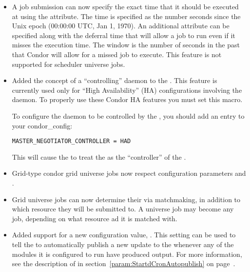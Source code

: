 \begin{itemize}
\item A job submission can now specify the exact time that it should be
executed at using the  attribute. The time is specified
as the number seconds since the Unix epoch (00:00:00 UTC, Jan 1, 1970).
An additional attribute  can be specified along with
the deferral time that will allow a job to run even if it misses the
execution time. The window is the number of seconds in the past that
Condor will allow for a missed job to execute. This feature is not 
supported for scheduler universe jobs.

\item Added the concept of a ``controlling'' daemon to the
.  This feature is currently used only for ``High
Availability'' (HA) configurations involving the  daemon.
To properly use these Condor HA features you must set this macro.  

To configure the  daemon to be controlled by the
, you should add an entry to your condor\_config:

\begin{verbatim}
MASTER_NEGOTIATOR_CONTROLLER = HAD
\end{verbatim}

This will cause the  to treat the  as the
``controller'' of the .

\item Grid-type condor grid universe jobs now respect configuration
parameters  and
.

\item Grid universe jobs can now determine their 
via matchmaking,
in addition to which resource they will be submitted to.
A  universe job may become any  job,
depending on what resource ad it is matched with.

\item Added support for a new configuration value,
  .
  This setting can be used to tell the  to
  automatically publish a new update to the 
  whenever any of the  modules it is configured to run have
  produced output.
  For more information, see the description of
   in
  section~\ref{param:StartdCronAutopublish} on
  page~\pageref{param:StartdCronAutopublish}. 


\end{itemize}
